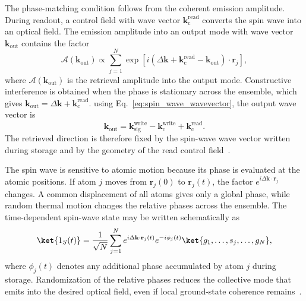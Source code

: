 The phase-matching condition follows from the coherent emission amplitude. During readout, a control field with wave vector \(\mathbf{k}_{\mathrm{c}}^{\mathrm{read}}\) converts the spin wave into an optical field. The emission amplitude into an output mode with wave vector \(\mathbf{k}_{\mathrm{out}}\) contains the factor~\cite{PsiL-odamIFm_GorshkovEtAl_2007}
\begin{equation}
    \mathcal{A}(\mathbf{k}_{\mathrm{out}})
    \propto
    \sum_{j=1}^{N}
    \exp\left[
    i\left(
    \Delta\mathbf{k}
    +
    \mathbf{k}_{\mathrm{c}}^{\mathrm{read}}
    -
    \mathbf{k}_{\mathrm{out}}
    \right)
    \cdot
    \mathbf{r}_j
    \right],
    \label{eq:spin_wave_readout_amplitude}
\end{equation}
where \(\mathcal{A}(\mathbf{k}_{\mathrm{out}})\) is the retrieval amplitude into the output mode. Constructive interference is obtained when the phase is stationary across the ensemble, which gives
$
    \mathbf{k}_{\mathrm{out}}
    =
    \Delta\mathbf{k}
    +
    \mathbf{k}_{\mathrm{c}}^{\mathrm{read}}.
    \label{eq:phase_matching_spin_wave}
$ using Eq.~\eqref{eq:spin_wave_wavevector}, the output wave vector is
\begin{equation}
    \mathbf{k}_{\mathrm{out}}
    =
    \mathbf{k}_{\mathrm{sig}}^{\mathrm{write}}
    -
    \mathbf{k}_{\mathrm{c}}^{\mathrm{write}}
    +
    \mathbf{k}_{\mathrm{c}}^{\mathrm{read}}.
    \label{eq:phase_matching_write_read}
\end{equation}
The retrieved direction is therefore fixed by the spin-wave wave vector written during storage and by the geometry of the read control field~\cite{PsiL-odamIFm_GorshkovEtAl_2007}.

The spin wave is sensitive to atomic motion because its phase is evaluated at the atomic positions. If atom \(j\) moves from \(\mathbf{r}_j(0)\) to \(\mathbf{r}_j(t)\), the factor \(e^{i\Delta\mathbf{k}\cdot\mathbf{r}_j}\) changes. A common displacement of all atoms gives only a global phase, while random thermal motion changes the relative phases across the ensemble. The time-dependent spin-wave state may be written schematically as~\cite{PsiL-odamIFm_GorshkovEtAl_2007}
\begin{equation}
    \ket{1_S(t)}
    =
    \frac{1}{\sqrt{N}}
    \sum_{j=1}^{N}
    e^{i\Delta\mathbf{k}\cdot\mathbf{r}_j(t)}
    e^{-i\phi_j(t)}
    \ket{g_1,\ldots,s_j,\ldots,g_N},
    \label{eq:time_dependent_spin_wave}
\end{equation}
where \(\phi_j(t)\) denotes any additional phase accumulated by atom \(j\) during storage. Randomization of the relative phases reduces the collective mode that emits into the desired optical field, even if local ground-state coherence remains~\cite{PsiL-odamIFm_GorshkovEtAl_2007}.


